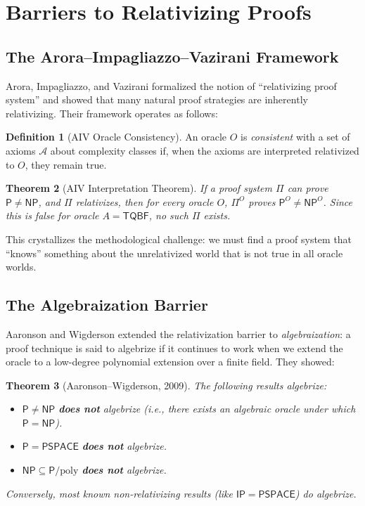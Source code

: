 \documentclass[11pt,a4paper]{article}
\theoremstyle{plain}
\newtheorem{theorem}{Theorem}[section]
\theoremstyle{definition}
\newtheorem{definition}[theorem]{Definition}
\theoremstyle{remark}
\newcommand{\PP}{\mathsf{P}}
\newcommand{\NP}{\mathsf{NP}}
\newcommand{\PSPACE}{\mathsf{PSPACE}}
\newcommand{\IP}{\mathsf{IP}}
\newcommand{\poly}{\mathrm{poly}}
\newcommand{\TQBF}{\mathsf{TQBF}}
\begin{document}
\section{Barriers to Relativizing Proofs}\label{sec:barriers}

\subsection{The Arora--Impagliazzo--Vazirani Framework}

Arora, Impagliazzo, and Vazirani \cite{AIV93} formalized the notion of
``relativizing proof system'' and showed that many natural proof strategies are
inherently relativizing.  Their framework operates as follows:

\begin{definition}[AIV Oracle Consistency]
An oracle $O$ is \emph{consistent} with a set of axioms $\mathcal{A}$ about
complexity classes if, when the axioms are interpreted relativized to $O$, they
remain true.
\end{definition}

\begin{theorem}[AIV Interpretation Theorem]
If a proof system $\Pi$ can prove $\PP \neq \NP$, and $\Pi$ relativizes, then
for every oracle $O$, $\Pi^O$ proves $\PP^O \neq \NP^O$.  Since this is false
for oracle $A = \TQBF$, no such $\Pi$ exists.
\end{theorem}

This crystallizes the methodological challenge: we must find a proof system that
``knows'' something about the unrelativized world that is not true in all oracle
worlds.

\subsection{The Algebraization Barrier}

Aaronson and Wigderson \cite{AW09} extended the relativization barrier to
\emph{algebraization}: a proof technique is said to algebrize if it continues to
work when we extend the oracle to a low-degree polynomial extension over a
finite field.  They showed:

\begin{theorem}[Aaronson--Wigderson, 2009]
The following results algebrize:
\begin{itemize}
    \item $\PP \neq \NP$ \textbf{does not} algebrize (i.e., there exists an
    algebraic oracle under which $\PP = \NP$).
    \item $\PP = \PSPACE$ \textbf{does not} algebrize.
    \item $\NP \subseteq \PP/\poly$ \textbf{does not} algebrize.
\end{itemize}
Conversely, most known non-relativizing results (like $\IP = \PSPACE$)
\emph{do} algebrize.
\end{theorem}
\end{document}
